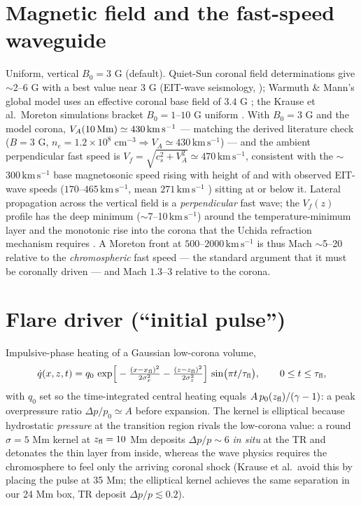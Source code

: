 \documentclass[11pt,a4paper]{article}
\newcommand{\kms}{\,\mathrm{km\,s^{-1}}}
\begin{document}
\section{Magnetic field and the fast-speed waveguide}

Uniform, vertical $B_0=3$ G (default). Quiet-Sun coronal field determinations give
$\sim$2--6 G with a best value near 3 G (EIT-wave seismology, \cite{West2011}); Warmuth
\& Mann's global model uses an effective coronal base field of $3.4$ G
\cite{WarmuthMann2005}; the Krause et al.\ Moreton simulations bracket $B_0=1$--$10$ G
uniform \cite{Krause2015}. With $B_0=3$ G and the model corona,
$V_A(10\,{\rm Mm})\simeq430\kms$ --- matching the derived literature check ($B=3$ G,
$n_e=1.2\times10^8\;\mathrm{cm^{-3}}\Rightarrow V_A\simeq430\kms$) --- and the ambient
perpendicular fast speed is $V_f=\sqrt{c_s^2+V_A^2}\simeq470\kms$, consistent with the
$\sim$300$\kms$ base magnetosonic speed rising with height of \cite{WarmuthMann2005} and
with observed EIT-wave speeds ($170$--$465\kms$, mean $271\kms$ \cite{Klassen2000})
sitting at or below it. Lateral propagation across the vertical field is a
\emph{perpendicular} fast wave; the $V_f(z)$ profile has the deep minimum
($\sim$7--10$\kms$) around the temperature-minimum layer and the monotonic rise into the
corona that the Uchida refraction mechanism requires \cite{Uchida1968}. A Moreton front
at $500$--$2000\kms$ is thus Mach $\sim$5--20 relative to the \emph{chromospheric} fast
speed --- the standard argument that it must be coronally driven \cite{Warmuth2015} ---
and Mach $1.3$--$3$ relative to the corona.

\section{Flare driver (``initial pulse'')}

Impulsive-phase heating of a Gaussian low-corona volume,
\begin{equation}
\dot q(x,z,t)=q_0\,
\exp\!\Big[-\tfrac{(x-x_{\rm fl})^2}{2\sigma_x^2}-\tfrac{(z-z_{\rm fl})^2}{2\sigma_z^2}\Big]\,
\sin\!\big(\pi t/\tau_{\rm fl}\big),\qquad 0\le t\le\tau_{\rm fl},
\end{equation}
with $q_0$ set so the time-integrated central heating equals
$A\,p_0(z_{\rm fl})/(\gamma-1)$: a peak overpressure ratio $\Delta p/p_0\simeq A$ before
expansion. The kernel is elliptical because hydrostatic \emph{pressure} at the transition
region rivals the low-corona value: a round $\sigma=5$ Mm kernel at $z_{\rm fl}=10$ Mm
deposits $\Delta p/p\sim6$ \emph{in situ} at the TR and detonates the thin layer from
inside, whereas the wave physics requires the chromosphere to feel only the arriving
coronal shock (Krause et al.\ avoid this by placing the pulse at 35 Mm; the elliptical
kernel achieves the same separation in our 24 Mm box, TR deposit $\Delta p/p\lesssim0.2$).
\end{document}
